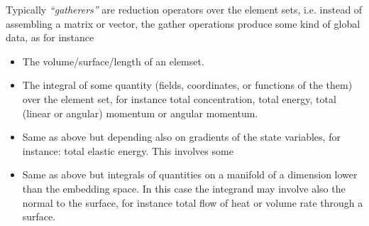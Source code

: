 
Typically \emph{``gatherers''} are reduction operators over the
element sets, i.e. instead of assembling a matrix or vector, the
gather operations produce some kind of global data, as for instance
%
\begin{itemize}
\compactlist 
\item The volume/surface/length of an elemset.
\item The integral of some quantity (fields, coordinates, or functions
  of the them) over the element set, for instance total concentration,
  total energy, total (linear or angular) momentum or angular
  momentum. 
\item Same as above but depending also on gradients of the state
  variables, for instance: total elastic energy. This involves some 
\item Same as above but integrals of quantities on a manifold of a
  dimension lower than the embedding space. In this case the integrand
  may involve also the normal to the surface, for instance total flow
  of heat or volume rate through a surface. 
\end{itemize}
 



